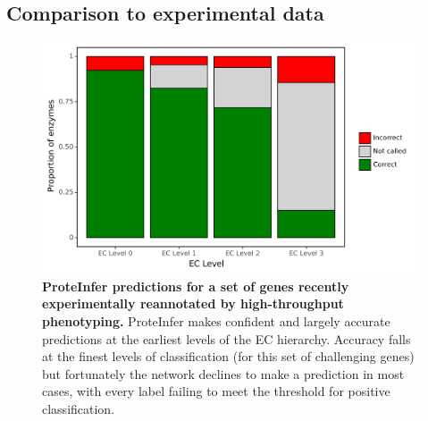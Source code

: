 \subsection*{Comparison to experimental data}
\begin{figure}[t]
\centering
  \includegraphics[width=\columnwidth]{price.png}%
  \caption{\textbf{ProteInfer predictions for a set of genes recently experimentally reannotated by high-throughput phenotyping.} ProteInfer makes confident and largely accurate predictions at the earliest levels of the EC hierarchy. Accuracy falls at the finest levels of classification (for this set of challenging genes) but fortunately the network declines to make a prediction in most cases, with every label failing to meet the threshold for positive classification. \label{fig:levels}}
\end{figure}



